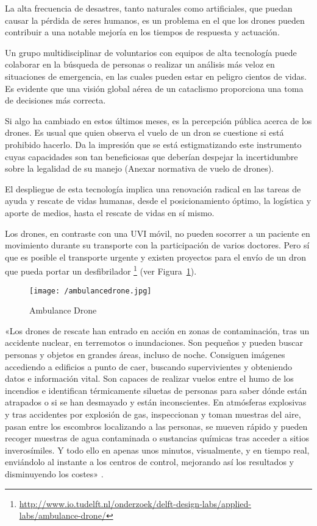 La alta frecuencia de desastres, tanto naturales como artificiales, que puedan causar la pérdida de seres humanos, es un problema en el que los drones pueden contribuir a una notable mejoría en los tiempos de respuesta y actuación.

Un grupo multidisciplinar de voluntarios con equipos de alta tecnología puede colaborar en la búsqueda de personas o realizar un análisis más veloz en situaciones de emergencia, en las cuales pueden estar en peligro cientos de vidas. Es evidente que una visión global aérea de un cataclismo proporciona una toma de decisiones más correcta.

Si algo ha cambiado en estos últimos meses, es la percepción pública acerca de los drones. Es usual que quien observa el vuelo de un dron se cuestione si está prohibido hacerlo. Da la impresión que se está estigmatizando este instrumento cuyas capacidades son tan beneficiosas que deberían despejar la incertidumbre sobre la legalidad de su manejo (Anexar normativa de vuelo de drones).

El despliegue de esta tecnología implica una renovación radical en las tareas de ayuda y rescate de vidas humanas, desde el posicionamiento óptimo, la logística y aporte de medios, hasta el rescate de vidas en sí mismo.

Los drones, en contraste con una UVI móvil, no pueden socorrer a un paciente en movimiento durante su transporte con la participación de varios doctores. Pero sí que es posible el transporte urgente y existen proyectos para el envío de un dron que pueda portar un desfibrilador \footnote{\url{http://www.io.tudelft.nl/onderzoek/delft-design-labs/applied-labs/ambulance-drone/}} (ver Figura~\ref{fig:ambulancedrone}).

\begin{figure}[!h]
\begin{center}
\texttt{[image: /ambulancedrone.jpg]}
\caption[Ambulance Drone]{Ambulance Drone}
\label{fig:ambulancedrone}
\end{center}
\end{figure}

«Los drones de rescate han entrado en acción en zonas de contaminación, tras un accidente nuclear, en terremotos o inundaciones. Son pequeños y pueden buscar personas y objetos en grandes áreas, incluso de noche. Consiguen imágenes accediendo a edificios a punto de caer, buscando supervivientes y obteniendo datos e información vital. Son capaces de realizar vuelos entre el humo de los incendios e identifican térmicamente siluetas de personas para saber dónde están atrapados o si se han desmayado y están inconscientes. En atmósferas explosivas y tras accidentes por explosión de gas, inspeccionan y toman muestras del aire, pasan entre los escombros localizando a las personas, se mueven rápido y pueden recoger muestras de agua contaminada o sustancias químicas tras acceder a sitios inverosímiles. Y todo ello en apenas unos minutos, visualmente, y en tiempo real, enviándolo al instante a los centros de control, mejorando así los resultados y disminuyendo los costes» \cite{dron3}.

